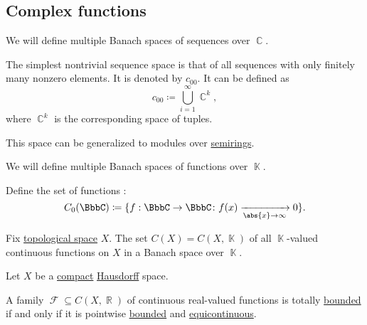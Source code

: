 \subsection{Complex functions}\label{subsec:complex_functions}

\begin{definition}\label{def:sequence_spaces}
  We will define multiple Banach spaces of sequences over \( \BbbC \).

  \begin{thmenum}
     The simplest nontrivial sequence space is that of all sequences with only finitely many nonzero elements. It is denoted by \( c_{00} \). It can be defined as
    \begin{equation*}
      c_{00} \coloneqq \bigcup_{i=1}^\infty \BbbC^k,
    \end{equation*}
    where \( \BbbC^k \) is the corresponding space of tuples.

    This space can be generalized to modules over \hyperref[def:module]{semirings}.
  \end{thmenum}
\end{definition}

\begin{definition}\label{def:function_spaces}
  We will define multiple Banach spaces of functions over \( \BbbK \).

  \begin{thmenum}
     Define the set of functions :
    \begin{equation*}
      C_0(\BbbC) \coloneqq \{ f: \BbbC \to \BbbC \colon f(x) \xrightarrow[\abs{x} \to \infty]{} 0 \}.
    \end{equation*}

     Fix \hyperref[def:topological_space]{topological space} \( X \). The set \( C(X) = C(X, \BbbK) \) of all \( \BbbK \)-valued continuous functions on \( X \) in a Banach space over \( \BbbK \).
  \end{thmenum}
\end{definition}

\begin{theorem}\label{thm:arzela_ascoli}
  Let \( X \) be a \hyperref[def:compact_space]{compact} \hyperref[def:separation_axioms/T2]{Hausdorff} space.

  A family \( \mscrF \subseteq C(X, \BbbR) \) of continuous real-valued functions is totally \hyperref[def:totally_bounded_set]{bounded} if and only if it is pointwise \hyperref[def:bounded_function/pointwise]{bounded} and \hyperref[def:function_set_continuity/equicontinuous]{equicontinuous}.
\end{theorem}
